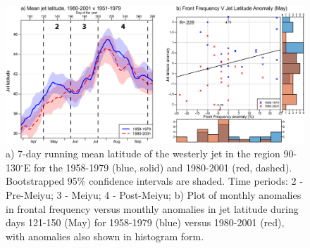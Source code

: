 \documentclass[draft,grl]{AGUTeX}
\begin{document}
\begin{figure}[htbp]
\begin{center}
\includegraphics[width=36pc]{Figures/jet}
\caption{a) 7-day running mean latitude of the westerly jet in the region 90-130$^\circ$E for the 1958-1979 (blue, solid) and 1980-2001 (red, dashed). Bootstrapped 95\% confidence intervals are shaded. Time periods: 2 - Pre-Meiyu; 3 - Meiyu; 4 - Post-Meiyu; b) Plot of monthly anomalies in frontal frequency versus monthly anomalies in jet latitude during days 121-150 (May) for 1958-1979 (blue) versus 1980-2001 (red), with anomalies also shown in histogram form.}
\label{jet_seasonal}
\end{center}
\end{figure}


\end{document}
